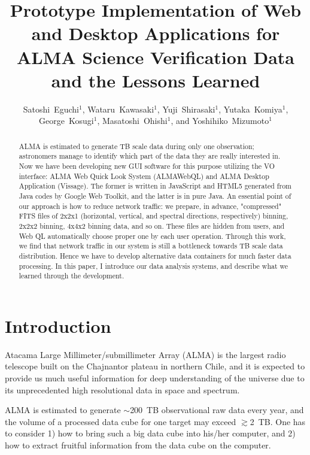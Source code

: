 \documentclass[11pt,twoside]{article}
\begin{document}
\title{Prototype Implementation of Web and Desktop Applications for ALMA Science Verification Data and the Lessons Learned}
\author{Satoshi~Eguchi$^1$, Wataru~Kawasaki$^1$, Yuji~Shirasaki$^1$, Yutaka~Komiya$^1$, George~Kosugi$^1$, Masatoshi~Ohishi$^1$, and Yoshihiko~Mizumoto$^1$
}

\begin{abstract}
ALMA is estimated to generate TB scale data during only one observation; astronomers manage to identify which part of the data they are really interested in.
Now we have been developing new GUI software for this purpose utilizing the VO interface: ALMA Web Quick Look System (ALMAWebQL) and ALMA Desktop Application (Vissage).
The former is written in JavaScript and HTML5 generated from Java codes by Google Web Toolkit, and the latter is in pure Java.
An essential point of our approach is how to reduce network traffic: we prepare, in advance, "compressed" FITS files of 2x2x1 (horizontal, vertical, and spectral directions, respectively) binning, 2x2x2 binning, 4x4x2 binning data, and so on.
These files are hidden from users, and Web QL automatically choose proper one by each user operation.
Through this work, we find that network traffic in our system is still a bottleneck towards TB scale data distribution.
Hence we have to develop alternative data containers for much faster data processing.
In this paper, I introduce our data analysis systems, and describe what we learned through the development.
\end{abstract}

\section{Introduction}

Atacama Large Millimeter/submillimeter Array (ALMA) is the largest radio telescope
built on the Chajnantor plateau in northern Chile, and it is expected to provide us
much useful information for deep understanding of the universe due to its unprecedented
high resolutional data in space and spectrum.

ALMA is estimated to generate $\sim$200\ TB observational raw data every year,
and the volume of a processed data cube for one target may exceed $\gtrsim$2\ TB.
One has to consider 1) how to bring such a big data cube into his/her computer,
and 2) how to extract fruitful information from the data cube on the computer.
\end{document}
